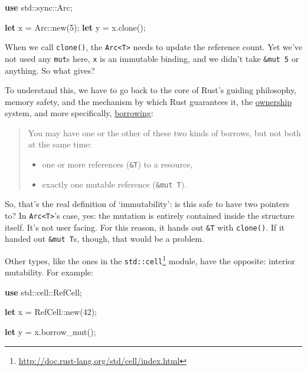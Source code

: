 \documentclass[a4paper,]{book}
\newenvironment{Shaded}{\begin{snugshade}}{\end{snugshade}}
\newcommand{\KeywordTok}[1]{\textcolor[rgb]{0.13,0.29,0.53}{\textbf{{#1}}}}
\newcommand{\DecValTok}[1]{\textcolor[rgb]{0.00,0.00,0.81}{{#1}}}
\newcommand{\NormalTok}[1]{{#1}}
\renewcommand{\href}[2]{#2\footnote{\url{#1}}}
\providecommand{\tightlist}{%
  \setlength{\itemsep}{0pt}\setlength{\parskip}{0pt}}
\begin{document}
\begin{Shaded}
\begin{Highlighting}[]
\KeywordTok{use} \NormalTok{std::sync::Arc;}

\KeywordTok{let} \NormalTok{x = Arc::new(}\DecValTok{5}\NormalTok{);}
\KeywordTok{let} \NormalTok{y = x.clone();}
\end{Highlighting}
\end{Shaded}

When we call \texttt{clone()}, the
\texttt{Arc\textless{}T\textgreater{}} needs to update the reference
count. Yet we've not used any \texttt{mut}s here, \texttt{x} is an
immutable binding, and we didn't take \texttt{\&mut\ 5} or anything. So
what gives?

To understand this, we have to go back to the core of Rust's guiding
philosophy, memory safety, and the mechanism by which Rust guarantees
it, the \protect\hyperlink{sec--ownership}{ownership} system, and more
specifically, \protect\hyperlink{borrowing}{borrowing}:

\begin{quote}
You may have one or the other of these two kinds of borrows, but not
both at the same time:

\begin{itemize}
\tightlist
\item
  one or more references (\texttt{\&T}) to a resource,
\item
  exactly one mutable reference (\texttt{\&mut\ T}).
\end{itemize}
\end{quote}

So, that's the real definition of `immutability': is this safe to have
two pointers to? In \texttt{Arc\textless{}T\textgreater{}}'s case, yes:
the mutation is entirely contained inside the structure itself. It's not
user facing. For this reason, it hands out \texttt{\&T} with
\texttt{clone()}. If it handed out \texttt{\&mut\ T}s, though, that
would be a problem.

Other types, like the ones in the
\href{http://doc.rust-lang.org/std/cell/index.html}{\texttt{std::cell}}
module, have the opposite: interior mutability. For example:

\begin{Shaded}
\begin{Highlighting}[]
\KeywordTok{use} \NormalTok{std::cell::RefCell;}

\KeywordTok{let} \NormalTok{x = RefCell::new(}\DecValTok{42}\NormalTok{);}

\KeywordTok{let} \NormalTok{y = x.borrow_mut();}
\end{Highlighting}
\end{Shaded}
\end{document}
